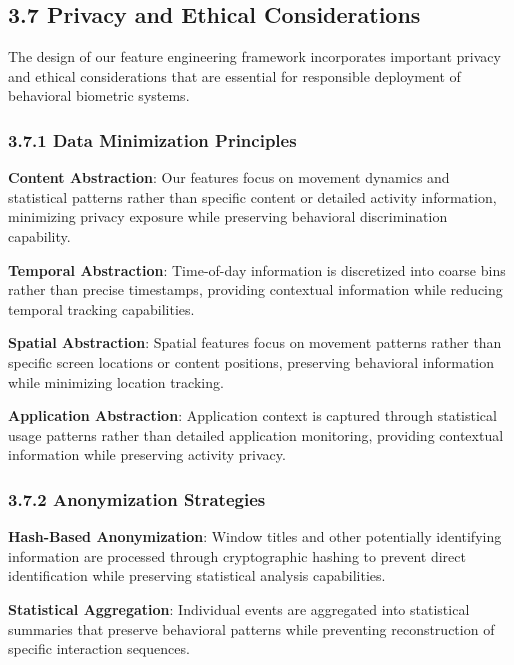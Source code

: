 \documentclass[
  11pt,
  a4paper,
]{article}
\begin{document}
\subsection{3.7 Privacy and Ethical
Considerations}\label{privacy-and-ethical-considerations}

The design of our feature engineering framework incorporates important
privacy and ethical considerations that are essential for responsible
deployment of behavioral biometric systems.

\subsubsection{3.7.1 Data Minimization
Principles}\label{data-minimization-principles}

\textbf{Content Abstraction}: Our features focus on movement dynamics
and statistical patterns rather than specific content or detailed
activity information, minimizing privacy exposure while preserving
behavioral discrimination capability.

\textbf{Temporal Abstraction}: Time-of-day information is discretized
into coarse bins rather than precise timestamps, providing contextual
information while reducing temporal tracking capabilities.

\textbf{Spatial Abstraction}: Spatial features focus on movement
patterns rather than specific screen locations or content positions,
preserving behavioral information while minimizing location tracking.

\textbf{Application Abstraction}: Application context is captured
through statistical usage patterns rather than detailed application
monitoring, providing contextual information while preserving activity
privacy.

\subsubsection{3.7.2 Anonymization
Strategies}\label{anonymization-strategies}

\textbf{Hash-Based Anonymization}: Window titles and other potentially
identifying information are processed through cryptographic hashing to
prevent direct identification while preserving statistical analysis
capabilities.

\textbf{Statistical Aggregation}: Individual events are aggregated into
statistical summaries that preserve behavioral patterns while preventing
reconstruction of specific interaction sequences.
\end{document}
